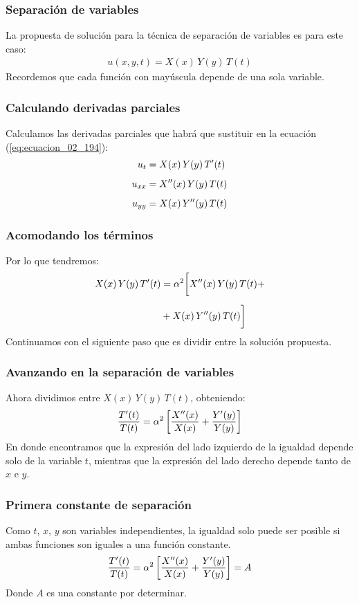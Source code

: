 \documentclass[12pt]{beamer}
\begin{document}
\begin{frame}
\frametitle{Separación de variables}
La propuesta de solución para la técnica de separación de variables es para este caso:
\begin{align}
u (x, y, t) = X(x) \, Y(y) \, T(t)
\label{eq:ecuacion_02_194}
\end{align}
\pause
Recordemos que cada función con mayúscula depende de una sola variable.
\end{frame}
\begin{frame}
\frametitle{Calculando derivadas parciales}
Calculamos las derivadas parciales que habrá que sustituir en la ecuación (\ref{eq:ecuacion_02_194}):
\begin{align*}
u_{t} &= X(x) \, Y(y) \, {T}^{\prime} (t) \\[0.5em]
u_{xx} &= {X}^{\prime \prime} (x) \, Y(y) \, T(t) \\[0.5em]
u_{yy} &= X(x) \, {Y}^{\prime \prime} (y) \, T(t)
\end{align*}
\end{frame}
\begin{frame}
\frametitle{Acomodando los términos}
Por lo que tendremos:
\begin{align*}
X(x) \, Y(y) \, {T}^{\prime} (t) &= \alpha^{2} \bigg[ {X}^{\prime \prime} (x) \, Y(y) \, T(t) + \\[0.5em]
&+ X(x) \, {Y}^{\prime \prime} (y) \, T(t) \bigg]
\end{align*}
\pause
Continuamos con el siguiente paso que es dividir entre la solución propuesta.
\end{frame}
\begin{frame}
\frametitle{Avanzando en la separación de variables}
Ahora dividimos entre $X(x) \, Y(y) \, T(t)$, obteniendo:
\pause
\begin{align*}
\dfrac{{T}^{\prime}(t)}{T(t)} = \alpha^{2} \left[ \dfrac{{X}^{\prime \prime}(x)}{X(x)} + \dfrac{{Y}^{\prime}(y)}{Y(y)} \right]
\end{align*}
\pause
En donde encontramos que la expresión del lado izquierdo de la igualdad depende solo de la variable $t$, mientras que la expresión del lado derecho depende tanto de $x$ e $y$.
\end{frame}
\begin{frame}
\frametitle{Primera constante de separación}
Como $t$, $x$, $y$ son variables independientes, la igualdad solo puede ser posible si ambas funciones son iguales a una función constante.
\pause
\begin{align*}
\dfrac{{T}^{\prime}(t) }{T(t)} =  \alpha^{2} \left[ \dfrac{{X}^{\prime \prime}(x)}{X(x)} + \dfrac{{Y}^{\prime}(y)}{Y(y)} \right] = A
\end{align*}
\pause
Donde $A$ es una constante por determinar.
\end{frame}
\end{document}
